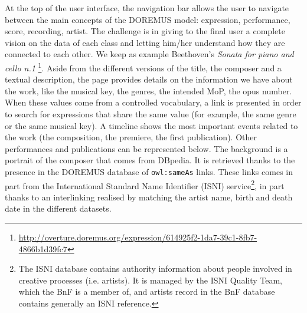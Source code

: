 At the top of the user interface, the navigation bar allows the user to navigate between the main concepts of the DOREMUS model: expression, performance, score, recording, artist. The challenge is in giving to the final user a complete vision on the data of each class and letting him/her understand how they are connected to each other. We keep as example Beethoven's \textit{Sonata for piano and cello n.1} \footnote{\url{http://overture.doremus.org/expression/614925f2-1da7-39c1-8fb7-4866b1d39fc7}}. Aside from the different versions of the title, the composer and a textual description, the page provides details on the information we have about the work, like the musical key, the genres, the intended MoP, the opus number. When these values come from a controlled vocabulary, a link is presented in order to search for expressions that share the same value (for example, the same genre or the same musical key). A timeline shows the most important events related to the work (the composition, the premiere, the first publication). Other performances and publications can be represented below. 
The background is a portrait of the composer that comes from DBpedia. It is retrieved thanks to the presence in the DOREMUS database of \texttt{owl:sameAs} links. These links comes in part from the International Standard Name Identifier (ISNI) service\footnote{The ISNI database contains authority information about people involved in creative processes (i.e. artists). It is managed by the ISNI Quality Team, which the BnF is a member of, and artists record in the BnF database contains generally an ISNI reference.}, in part thanks to an interlinking realised by matching the artist name, birth and death date in the different datasets.

